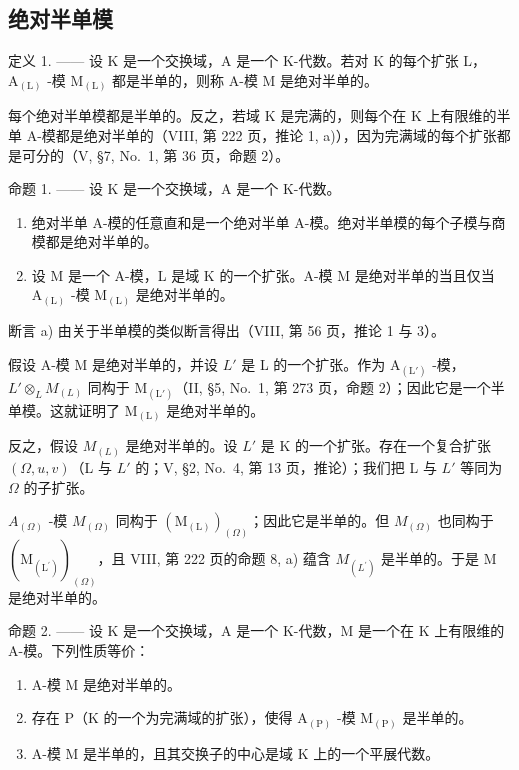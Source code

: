 \subsection{绝对半单模}

定义 1. —— 设 K 是一个交换域，A 是一个 K-代数。若对 K 的每个扩张 L，\(\mathrm{A}_{(\mathrm{L})}\) -模 \(\mathrm{M}_{(\mathrm{L})}\) 都是半单的，则称 A-模 M 是绝对半单的。

每个绝对半单模都是半单的。反之，若域 K 是完满的，则每个在 K 上有限维的半单 A-模都是绝对半单的（VIII, 第 222 页，推论 1, a)），因为完满域的每个扩张都是可分的（V, §7, No.~1, 第 36 页，命题 2）。

命题 1. —— 设 K 是一个交换域，A 是一个 K-代数。

\begin{enumerate}
\def\labelenumi{\alph{enumi})}
\item
  绝对半单 A-模的任意直和是一个绝对半单 A-模。绝对半单模的每个子模与商模都是绝对半单的。
\item
  设 M 是一个 A-模，L 是域 K 的一个扩张。A-模 M 是绝对半单的当且仅当 \(\mathrm{A}_{(\mathrm{L})}\) -模 \(\mathrm{M}_{(\mathrm{L})}\) 是绝对半单的。
\end{enumerate}

断言 a) 由关于半单模的类似断言得出（VIII, 第 56 页，推论 1 与 3）。

假设 A-模 M 是绝对半单的，并设 \(L'\) 是 L 的一个扩张。作为 \(\mathrm{A}_{(\mathrm{L}')}\) -模，\(L' \otimes_{L} M_{(L)}\) 同构于 \(\mathrm{M}_{(\mathrm{L}')}\)（II, §5, No.~1, 第 273 页，命题 2）；因此它是一个半单模。这就证明了 \(\mathrm{M}_{(\mathrm{L})}\) 是绝对半单的。

反之，假设 \(M_{(L)}\) 是绝对半单的。设 \(L'\) 是 K 的一个扩张。存在一个复合扩张 \((\Omega, u, v)\)（L 与 \(L'\) 的；V, §2, No.~4, 第 13 页，推论）；我们把 L 与 \(L'\) 等同为 \(\Omega\) 的子扩张。

\(A_{(\Omega)}\) -模 \(M_{(\Omega)}\) 同构于 \((\mathrm{M}_{(\mathrm{L})})_{(\Omega)}\)；因此它是半单的。但 \(M_{(\Omega)}\) 也同构于 \((\mathrm{M}_{(\mathrm{L}^{\prime})})_{(\Omega)}\)，且 VIII, 第 222 页的命题 8, a) 蕴含 \(M_{(L^{\prime})}\) 是半单的。于是 M 是绝对半单的。

命题 2. —— 设 K 是一个交换域，A 是一个 K-代数，M 是一个在 K 上有限维的 A-模。下列性质等价：

\begin{enumerate}
\def\labelenumi{(\roman{enumi})}
\item
  A-模 M 是绝对半单的。
\item
  存在 \(\mathrm{P}\)（\(\mathrm{K}\) 的一个为完满域的扩张），使得 \(\mathrm{A}_{(\mathrm{P})}\) -模 \(\mathrm{M}_{(\mathrm{P})}\) 是半单的。
\item
  A-模 M 是半单的，且其交换子的中心是域 K 上的一个平展代数。
\end{enumerate}

